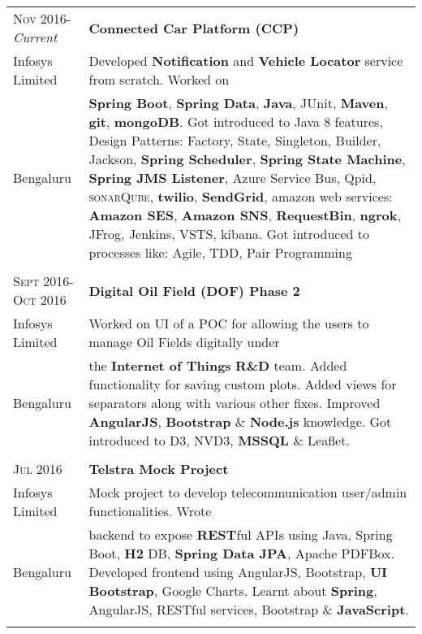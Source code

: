\documentclass[a4paper,10pt]{article} %
\begin{document}
\begin{tabular}{l|p{11cm}}
\textsc{Nov 2016-}\emph{Current} & \textbf{Connected Car Platform (CCP)} \\
Infosys Limited & \footnotesize{Developed \textbf{Notification} and \textbf{Vehicle Locator} service from scratch. Worked on}\\ 
Bengaluru & \footnotesize{\textbf{Spring Boot}, \textbf{Spring Data}, \textbf{Java}, JUnit, \textbf{Maven}, \textbf{git}, \textbf{mongoDB}. Got introduced to Java 8 features, Design Patterns: Factory, State, Singleton, Builder, Jackson, \textbf{Spring Scheduler}, \textbf{Spring State Machine}, \textbf{Spring JMS Listener}, Azure Service Bus, Qpid, \textsc{sonar}Q\textsc{ube}, \textbf{twilio}, \textbf{SendGrid}, amazon web services: \textbf{Amazon SES}, \textbf{Amazon SNS}, \textbf{RequestBin}, \textbf{ngrok}, JFrog, Jenkins, VSTS,  kibana. Got introduced to processes like: Agile, TDD, Pair Programming}\\
\multicolumn{2}{c}{} \\


\textsc{Sept 2016-Oct 2016} & \textbf{Digital Oil Field (DOF) Phase 2}\emph{}\\
Infosys Limited & \footnotesize{Worked on UI of a POC for allowing the users to manage Oil Fields digitally under}\\
Bengaluru & \footnotesize{the \textbf{Internet of Things} \textbf{R\&D} team. Added functionality for saving custom plots. Added views for separators along with various other fixes. Improved \textbf{AngularJS}, \textbf{Bootstrap} \& \textbf{Node.js} knowledge. Got introduced to D3, NVD3, \textbf{MSSQL} \& Leaflet.}\\
\multicolumn{2}{c}{} \\


\textsc{Jul 2016} & \textbf{Telstra Mock Project} \emph{}\\
Infosys Limited & \footnotesize{Mock project to develop telecommunication user/admin functionalities. Wrote}\\
Bengaluru & \footnotesize{backend to expose \textbf{REST}ful APIs using Java, Spring Boot, \textbf{H2} DB, \textbf{Spring Data JPA}, Apache PDFBox. Developed frontend using AngularJS, Bootstrap, \textbf{UI Bootstrap}, Google Charts. Learnt about \textbf{Spring}, AngularJS, RESTful services, Bootstrap \& \textbf{JavaScript}.}\\
\multicolumn{2}{c}{} \\


\end{tabular}
\end{document}
